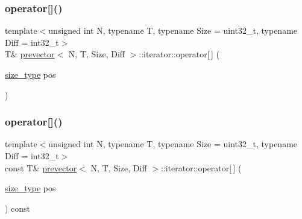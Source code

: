 \mbox{\label{classprevector_1_1iterator_ad2061d89001f5888618c29cf2f82ceae}} 
\subsubsection{\texorpdfstring{operator[]()}{operator[]()}\hspace{0.1cm}{\footnotesize\ttfamily [1/2]}}
{\footnotesize\ttfamily template$<$unsigned int N, typename T, typename Size = uint32\+\_\+t, typename Diff = int32\+\_\+t$>$ \\
T\& \mbox{\hyperlink{classprevector}{prevector}}$<$ N, T, Size, Diff $>$\+::iterator\+::operator\mbox{[}$\,$\mbox{]} (\begin{DoxyParamCaption}\item[{\mbox{\hyperlink{classprevector_a7e0da95e6d1c878f6eeb572f4fc12524}{size\+\_\+type}}}]{pos }\end{DoxyParamCaption})\hspace{0.3cm}{\ttfamily [inline]}}

\mbox{\label{classprevector_1_1iterator_a2b51fedc4baf3c4bbb82d23d31d13ef3}} 
\subsubsection{\texorpdfstring{operator[]()}{operator[]()}\hspace{0.1cm}{\footnotesize\ttfamily [2/2]}}
{\footnotesize\ttfamily template$<$unsigned int N, typename T, typename Size = uint32\+\_\+t, typename Diff = int32\+\_\+t$>$ \\
const T\& \mbox{\hyperlink{classprevector}{prevector}}$<$ N, T, Size, Diff $>$\+::iterator\+::operator\mbox{[}$\,$\mbox{]} (\begin{DoxyParamCaption}\item[{\mbox{\hyperlink{classprevector_a7e0da95e6d1c878f6eeb572f4fc12524}{size\+\_\+type}}}]{pos }\end{DoxyParamCaption}) const\hspace{0.3cm}{\ttfamily [inline]}}



